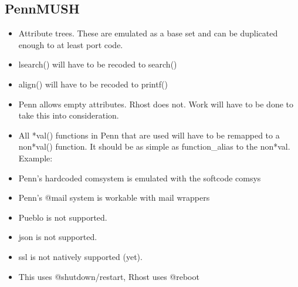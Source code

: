 \documentclass[letterpaper,10pt,english]{sphinxmanual}
\begin{document}
\subsection{PennMUSH}
\label{\detokenize{differences:pennmush}}\begin{itemize}
\item {} 
\sphinxAtStartPar
Attribute trees.  These are emulated as a base set and can be duplicated enough to at least port code.

\item {} 
\sphinxAtStartPar
lsearch() will have to be recoded to search()

\item {} 
\sphinxAtStartPar
align() will have to be recoded to printf()

\item {} 
\sphinxAtStartPar
Penn allows empty attributes.  Rhost does not.  Work will have to be done to take this into consideration.

\item {} 
\sphinxAtStartPar
All *val() functions in Penn that are used will have to be remapped to a non\sphinxhyphen{}*val() function.  It should be as simple as function\_alias to the non\sphinxhyphen{}*val.  Example:

\begin{sphinxVerbatim}[commandchars=\\\{\}]
  
\end{sphinxVerbatim}

\item {} 
\sphinxAtStartPar
Penn’s hardcoded comsystem is emulated with the softcode comsys

\item {} 
\sphinxAtStartPar
Penn’s @mail system is workable with mail wrappers

\item {} 
\sphinxAtStartPar
Pueblo is not supported.

\item {} 
\sphinxAtStartPar
json is not supported.

\item {} 
\sphinxAtStartPar
ssl is not natively supported (yet).

\item {} 
\sphinxAtStartPar
This uses @shutdown/restart, Rhost uses @reboot

\end{itemize}
\end{document}
